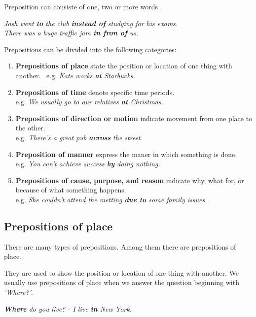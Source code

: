 \documentclass[hidelinks,10pt,a4paper]{article}
\begin{document}
Preposition can consiste of one, two or more words.

\begin{center}
	\textit{Josh went \textbf{to} the club \textbf{instead of} studying for his exams. \\
	There was a huge traffic jam \textbf{in fron of} us.}
\end{center}

Prepositions can be divided into the following categories:
\begin{enumerate}[label=(\alph*)]
	\item \textbf{Prepositions of place} state the position or location of one thing with another. \
		e.g. \textit{Kate works \textbf{at} Starbucks.}
	\item \textbf{Prepositions of time} denote specific time periods. \\
		e.g. \textit{We usually go to our relatives \textbf{at} Christmas.}
	\item \textbf{Prepositions of direction or motion} indicate movement from one place to the other. \\
		e.g. \textit{There's a great pub \textbf{across} the street.}
	\item \textbf{Preposition of manner} express the maner in which something is done. \\
		e.g. \textit{You can't achieve success \textbf{by} doing nothing.}
	\item \textbf{Prepositions of cause, purpose, and reason} indicate why, what for, or because of what something happens. \\
		e.g. \textit{She couldn't attend the metting \textbf{due to} some family issues.}
\end{enumerate}

\subsection{Prepositions of place}
There are many types of prepositions. Among them there are prepositions of place.

They are used to show the position or location of one thing with another. We usually use prepositions of place when we answer the question beginning with \textit{'Where?'}.

\begin{center}
	\textit{\textbf{Where} do you live? - I live \textbf{in} New York.}
\end{center}
\end{document}
